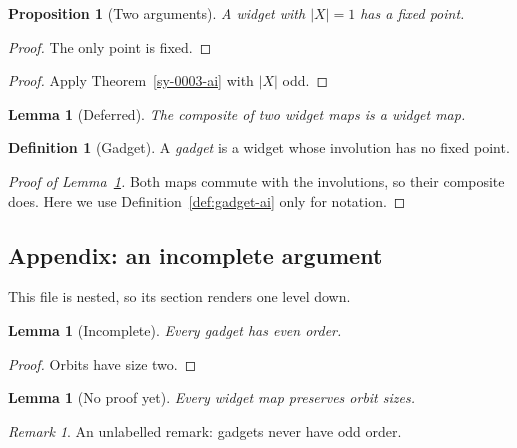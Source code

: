 \documentclass{amsart}
\theoremstyle{plain}
\newtheorem{lemma}[theorem]{Lemma}
\newtheorem{proposition}[theorem]{Proposition}
\theoremstyle{definition}
\newtheorem{definition}[theorem]{Definition}
\theoremstyle{remark}
\newtheorem{remark}[theorem]{Remark}
\begin{document}
\begin{proposition}[Two arguments]\label{sy-0006-ai}
A widget with $|X| = 1$ has a fixed point.
\end{proposition}
\begin{proof}
The only point is fixed.
\end{proof}
\begin{proof}
Apply Theorem~\ref{sy-0003-ai} with $|X|$ odd.
\end{proof}



\begin{lemma}[Deferred]\label{sy-0007-ai}
The composite of two widget maps is a widget map.
\end{lemma}


\begin{definition}[Gadget]\label{sy-0008-ai}\label{def:gadget-ai}\label{defn:gadget-old-ai}
A \emph{gadget} is a widget whose involution has no fixed point.
\end{definition}


\begin{proof}[Proof of Lemma~\ref{sy-0007-ai}]
Both maps commute with the involutions, so their composite does. Here we use Definition~\ref{def:gadget-ai} only for notation.
\end{proof}



\subsection{Appendix: an incomplete argument}\label{sy-0300-ai}

This file is nested, so its section renders one level down.

\begin{lemma}[Incomplete]\label{sy-000C-ai}
Every gadget has even order.
\end{lemma}
\begin{proof}
Orbits have size two. 
\end{proof}

\begin{lemma}[No proof yet]\label{sy-000D-ai}
Every widget map preserves orbit sizes.
\end{lemma}

\begin{remark}
An unlabelled remark: gadgets never have odd order.
\end{remark}
\end{document}
